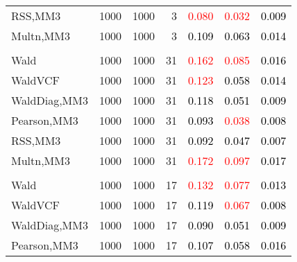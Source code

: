 \documentclass[
]{article}
\begin{document}
\begin{table}[H]
{\begin{tabular}[t]{lrrrrrr}
\hspace{1em}RSS,MM3 & 1000 & 1000 & 3 & \textcolor{red}{0.080} & \textcolor{red}{0.032} & \textcolor{black}{0.009}\\
\hspace{1em}Multn,MM3 & 1000 & 1000 & 3 & \textcolor{black}{0.109} & \textcolor{black}{0.063} & \textcolor{black}{0.014}\\
\addlinespace[0.3em]
\multicolumn{7}{l}{\textbf{1F 15V}}\\
\hspace{1em}Wald & 1000 & 1000 & 31 & \textcolor{red}{0.162} & \textcolor{red}{0.085} & \textcolor{black}{0.016}\\
\hspace{1em}WaldVCF & 1000 & 1000 & 31 & \textcolor{red}{0.123} & \textcolor{black}{0.058} & \textcolor{black}{0.014}\\
\hspace{1em}WaldDiag,MM3 & 1000 & 1000 & 31 & \textcolor{black}{0.118} & \textcolor{black}{0.051} & \textcolor{black}{0.009}\\
\hspace{1em}Pearson,MM3 & 1000 & 1000 & 31 & \textcolor{black}{0.093} & \textcolor{red}{0.038} & \textcolor{black}{0.008}\\
\hspace{1em}RSS,MM3 & 1000 & 1000 & 31 & \textcolor{black}{0.092} & \textcolor{black}{0.047} & \textcolor{black}{0.007}\\
\hspace{1em}Multn,MM3 & 1000 & 1000 & 31 & \textcolor{red}{0.172} & \textcolor{red}{0.097} & \textcolor{black}{0.017}\\
\addlinespace[0.3em]
\multicolumn{7}{l}{\textbf{2F 10V}}\\
\hspace{1em}Wald & 1000 & 1000 & 17 & \textcolor{red}{0.132} & \textcolor{red}{0.077} & \textcolor{black}{0.013}\\
\hspace{1em}WaldVCF & 1000 & 1000 & 17 & \textcolor{black}{0.119} & \textcolor{red}{0.067} & \textcolor{black}{0.008}\\
\hspace{1em}WaldDiag,MM3 & 1000 & 1000 & 17 & \textcolor{black}{0.090} & \textcolor{black}{0.051} & \textcolor{black}{0.009}\\
\hspace{1em}Pearson,MM3 & 1000 & 1000 & 17 & \textcolor{black}{0.107} & \textcolor{black}{0.058} & \textcolor{black}{0.016}\\

\end{tabular}}
\end{table}
\end{document}
